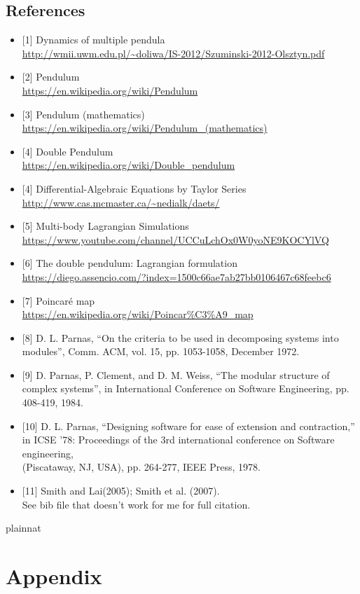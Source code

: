 \documentclass[12pt, titlepage]{article}
\begin{document}
\subsection*{References}\label{ssec:ref} 
\begin{itemize}
\item{[1]} Dynamics of multiple pendula 
\\\url{http://wmii.uwm.edu.pl/~doliwa/IS-2012/Szuminski-2012-Olsztyn.pdf}
\item{[2]} Pendulum \\\url{https://en.wikipedia.org/wiki/Pendulum}
\item{[3]} Pendulum (mathematics)
\\\url{https://en.wikipedia.org/wiki/Pendulum_(mathematics)}
\item{[4]} Double Pendulum
\\\url{https://en.wikipedia.org/wiki/Double_pendulum}\item{[4]}
Differential-Algebraic Equations by Taylor Series
\\\url{http://www.cas.mcmaster.ca/~nedialk/daets/}
\item{[5]} Multi-body Lagrangian Simulations
\\\url{https://www.youtube.com/channel/UCCuLchOx0W0yoNE9KOCYlVQ}
\item{[6]} The double pendulum: Lagrangian formulation
\\\url{https://diego.assencio.com/?index=1500c66ae7ab27bb0106467c68feebc6}
\item{[7]} Poincaré map
\\\url{https://en.wikipedia.org/wiki/Poincar%C3%A9_map}
\item{[8]} D. L. Parnas, ``On the criteria to be used in decomposing systems 
into modules'', Comm. ACM, vol. 15, pp. 1053-1058, December 1972.
\item{[9]} D. Parnas, P. Clement, and D. M. Weiss, ``The modular structure of 
complex systems'', in International Conference on Software Engineering, 
pp. 408-419, 1984.
\item{[10]} D. L. Parnas, ``Designing software for ease of extension and 
contraction,'' in ICSE '78: Proceedings of the 3rd international conference on 
Software engineering, \\
(Piscataway, NJ, USA), pp. 264-277, IEEE Press, 1978.
\item{[11]} Smith and Lai(2005); Smith et al. (2007). \\
See bib file that doesn't work for me for full citation.
\end{itemize}

 {plainnat}


\newpage

\section{Appendix} \label{Appendix}

\end{document}
